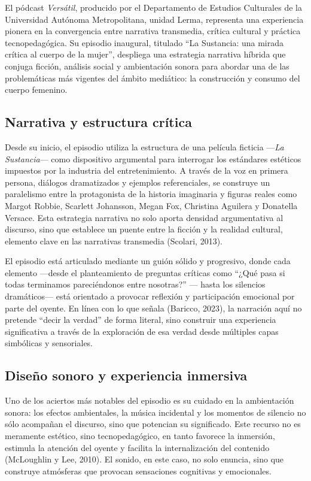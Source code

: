\documentclass[
]{interact}
\begin{document}
El pódcast \emph{Versátil}, producido por el Departamento de Estudios
Culturales de la Universidad Autónoma Metropolitana, unidad Lerma,
representa una experiencia pionera en la convergencia entre narrativa
transmedia, crítica cultural y práctica tecnopedagógica. Su episodio
inaugural, titulado ``La Sustancia: una mirada crítica al cuerpo de la
mujer'', despliega una estrategia narrativa híbrida que conjuga ficción,
análisis social y ambientación sonora para abordar una de las
problemáticas más vigentes del ámbito mediático: la construcción y
consumo del cuerpo femenino.

\subsection{Narrativa y estructura
crítica}\label{narrativa-y-estructura-cruxedtica}

Desde su inicio, el episodio utiliza la estructura de una película
ficticia ---\emph{La Sustancia}--- como dispositivo argumental para
interrogar los estándares estéticos impuestos por la industria del
entretenimiento. A través de la voz en primera persona, diálogos
dramatizados y ejemplos referenciales, se construye un paralelismo entre
la protagonista de la historia imaginaria y figuras reales como Margot
Robbie, Scarlett Johansson, Megan Fox, Christina Aguilera y Donatella
Versace. Esta estrategia narrativa no solo aporta densidad argumentativa
al discurso, sino que establece un puente entre la ficción y la realidad
cultural, elemento clave en las narrativas transmedia (Scolari, 2013).

El episodio está articulado mediante un guión sólido y progresivo, donde
cada elemento ---desde el planteamiento de preguntas críticas como
``¿Qué pasa si todas terminamos pareciéndonos entre nosotras?'' ---
hasta los silencios dramáticos--- está orientado a provocar reflexión y
participación emocional por parte del oyente. En línea con lo que señala
(Baricco, 2023), la narración aquí no pretende ``decir la verdad'' de
forma literal, sino construir una experiencia significativa a través de
la exploración de esa verdad desde múltiples capas simbólicas y
sensoriales.

\subsection{Diseño sonoro y experiencia
inmersiva}\label{diseuxf1o-sonoro-y-experiencia-inmersiva}

Uno de los aciertos más notables del episodio es su cuidado en la
ambientación sonora: los efectos ambientales, la música incidental y los
momentos de silencio no sólo acompañan el discurso, sino que potencian
su significado. Este recurso no es meramente estético, sino
tecnopedagógico, en tanto favorece la inmersión, estimula la atención
del oyente y facilita la internalización del contenido (McLoughlin y
Lee, 2010). El sonido, en este caso, no solo enuncia, sino que construye
atmósferas que provocan sensaciones cognitivas y emocionales.
\end{document}
